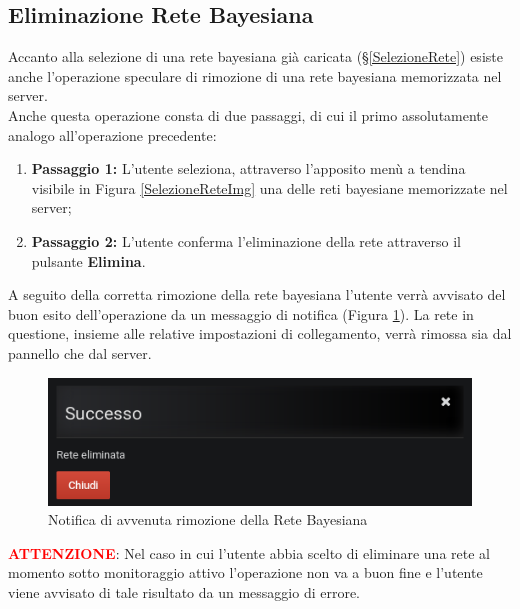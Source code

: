 \subsection{Eliminazione Rete Bayesiana}\label{EliminazioneRete}

Accanto alla selezione di una rete bayesiana già caricata (§\ref{SelezioneRete}) esiste anche l'operazione speculare di rimozione di una rete bayesiana memorizzata nel server.\\
Anche questa operazione consta di due passaggi, di cui il primo assolutamente analogo all'operazione precedente:
\begin{enumerate}
	\item \textbf{Passaggio 1:} L'utente seleziona, attraverso l'apposito menù a tendina visibile in Figura \ref{SelezioneReteImg} una delle reti bayesiane memorizzate nel server;
	\item \textbf{Passaggio 2:} L'utente conferma l'eliminazione della rete attraverso il pulsante \textbf{Elimina}.
\end{enumerate}

A seguito della corretta rimozione della rete bayesiana l'utente verrà avvisato del buon esito dell'operazione da un messaggio di notifica (Figura \ref{NotificaRimozioneRete}). La rete in questione, insieme alle relative impostazioni di collegamento, verrà rimossa sia dal pannello che dal server.

\begin{figure}[H]
	\begin{center}
		\includegraphics[scale=0.6]{./images/NotificaRimozioneRete.png}
		 \caption{Notifica di avvenuta rimozione della Rete Bayesiana}	
		 \label{NotificaRimozioneRete}
	\end{center}
\end{figure}

\textbf{\textcolor{red}{ATTENZIONE}}: Nel caso in cui l'utente abbia scelto di eliminare una rete al momento sotto monitoraggio attivo l'operazione non va a buon fine e l'utente viene avvisato di tale risultato da un messaggio di errore.
